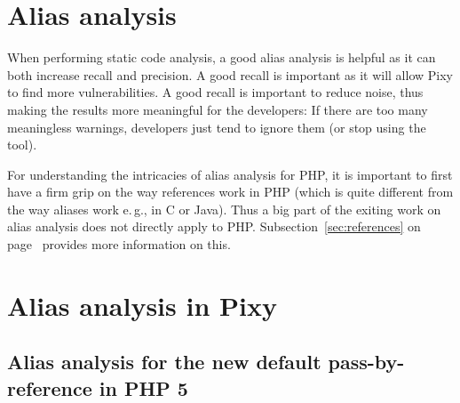 \chapter{Alias analysis}

When performing static code analysis, a good alias analysis is helpful as it can both increase recall and precision. A good recall is important as it will allow Pixy to find more vulnerabilities. A good recall is important to reduce noise, thus making the results more meaningful for the developers: If there are too many meaningless warnings, developers just tend to ignore them (or stop using the tool).~\cite{understanding-value}

For understanding the intricacies of alias analysis for PHP, it is important to first have a firm grip on the way references work in PHP (which is quite different from the way aliases work e.\,g., in C or Java). Thus a big part of the exiting work on alias analysis does not directly apply to PHP. Subsection~\ref{sec:references} on page~\pageref{sec:references} provides more information on this.

\chapter{Alias analysis in Pixy}


\section{Alias analysis for the new default pass-by-reference in PHP 5}
